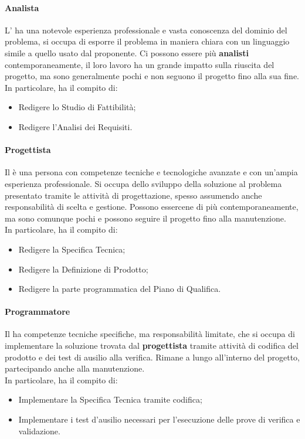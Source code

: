 \documentclass[../norme_di_progetto.tex]{subfiles}
\begin{document}
        \paragraph{Analista}
        L'\textbf{} ha una notevole esperienza professionale e vasta conoscenza del dominio del problema, si occupa di esporre il problema in maniera chiara con un linguaggio simile a quello usato dal proponente. Ci possono essere più \textbf{analisti} contemporaneamente, il loro lavoro ha un grande impatto sulla riuscita del progetto, ma sono generalmente pochi e non seguono il progetto fino alla sua fine.\\
        In particolare, ha il compito di:
        \begin{itemize} 
            \item Redigere lo Studio di Fattibilità;
            \item Redigere l'Analisi dei Requisiti.
        \end{itemize}

        \paragraph{Progettista}
        Il \textbf{} è una persona con competenze tecniche e tecnologiche avanzate e con un'ampia esperienza professionale. Si occupa dello sviluppo della soluzione al problema presentato tramite le attività di progettazione, spesso assumendo anche responsabilità di scelta e gestione. Possono essercene di più contemporaneamente, ma sono comunque pochi e possono seguire il progetto fino alla manutenzione.\\
        In particolare, ha il compito di:
        \begin{itemize}
            \item Redigere la Specifica Tecnica;
            \item Redigere la Definizione di Prodotto;
            \item Redigere la parte programmatica del Piano di Qualifica.
        \end{itemize}

        \paragraph{Programmatore}
        Il \textbf{} ha competenze tecniche specifiche, ma responsabilità limitate, che si occupa di implementare la soluzione trovata dal \textbf{progettista} tramite attività di codifica del prodotto e dei test di ausilio alla verifica. Rimane a lungo all'interno del progetto, partecipando anche alla manutenzione.\\
        In particolare, ha il compito di:
        \begin{itemize}
            \item Implementare la Specifica Tecnica tramite codifica;
            \item Implementare i test d'ausilio necessari per l'esecuzione delle prove di verifica e validazione.
        \end{itemize}
\end{document}
